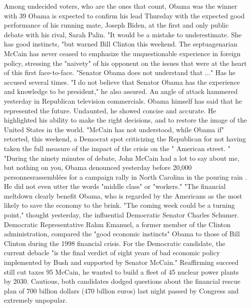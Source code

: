 Among undecided voters, who are the ones that count, Obama was the winner with 39%
Obama is expected to confirm his lead Thursday with the expected good performance of his running mate, Joseph Biden, at the first and only public debate with his rival, Sarah Palin.
"It would be a mistake to underestimate.
She has good instincts, "but warned Bill Clinton this weekend.
The septuagenarian McCain has never ceased to emphasize the unquestionable experience in foreign policy, stressing the "naivety" of his opponent on the issues that were at the heart of this first face-to-face.
"Senator Obama does not understand that ..." Has he accused several times.
"I do not believe that Senator Obama has the experience and knowledge to be president," he also assured.
An angle of attack hammered yesterday in Republican television commercials.
Obama himself has said that he represented the future.
Undaunted, he showed concise and accurate.
He highlighted his ability to make the right decisions, and to restore the image of the United States in the world.
"McCain has not understood, while Obama if" retorted, this weekend, a Democrat spot criticizing the Republican for not having taken the full measure of the impact of the crisis on the " American street. "
"During the ninety minutes of debate, John McCain had a lot to say about me, but nothing on you, Obama denounced yesterday before 20,000 personnesrassemblées for a campaign rally in North Carolina in the pouring rain .
He did not even utter the words "middle class" or "workers." "The financial meltdown clearly benefit Obama, who is regarded by the Americans as the most likely to save the economy to the brink.
"The coming week could be a turning point," thought yesterday, the influential Democratic Senator Charles Schumer.
Democratic Representative Rahm Emanuel, a former member of the Clinton administration, compared the "good economic instincts" Obama to those of Bill Clinton during the 1998 financial crisis.
For the Democratic candidate, the current debacle "is the final verdict of eight years of bad economic policy implemented by Bush and supported by Senator McCain."
Reaffirming succeed still cut taxes 95%
McCain, he wanted to build a fleet of 45 nuclear power plants by 2030.
Cautious, both candidates dodged questions about the financial rescue plan of 700 billion dollars (470 billion euros) last night passed by Congress and extremely unpopular.
